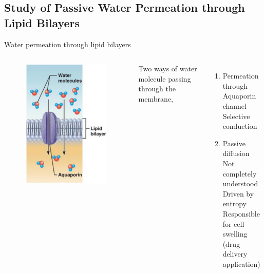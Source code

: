 \documentclass{beamer}
\begin{document}
\subsection{Study of Passive Water Permeation through Lipid Bilayers} 
\begin{frame}{Water permeation through lipid bilayers}
\begin{columns}
	\begin{figure}
		\includegraphics[height=.8\textheight]{Pics/lipid_water}
	\end{figure}
	Two ways of water molecule passing through the membrane, 
	\begin{enumerate}
		\item Permeation through Aquaporin channel \\
			Selective conduction
		\item {\color{red} Passive diffusion} \\
			Not completely understood\\
			Driven by entropy \\
			Responsible for cell swelling\\
			(drug delivery application)
	\end{enumerate}
\end{columns}
\end{frame}
\end{document}
